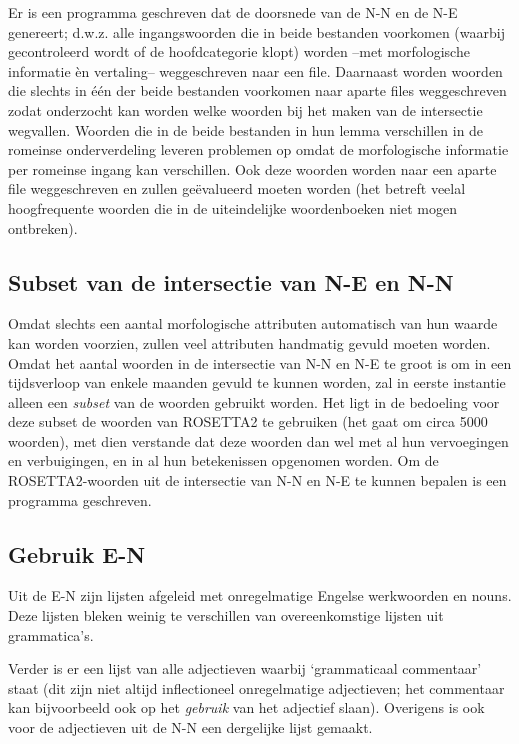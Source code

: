 Er is een programma geschreven dat de doorsnede van de N-N en de N-E genereert;
d.w.z. alle ingangswoorden die in beide bestanden voorkomen (waarbij 
gecontroleerd wordt of de hoofdcategorie klopt) worden --met morfologische 
informatie \`{e}n vertaling-- weggeschreven naar een
file. Daarnaast worden woorden die slechts in \'{e}\'{e}n der beide bestanden 
voorkomen
naar aparte files weggeschreven zodat onderzocht kan worden welke woorden
bij het maken van de intersectie wegvallen. 
Woorden die in de beide bestanden in hun lemma verschillen in de romeinse 
onderverdeling leveren problemen op omdat de morfologische informatie per
romeinse ingang kan verschillen. Ook deze woorden worden naar een aparte file 
weggeschreven en zullen ge\"{e}valueerd moeten worden (het betreft veelal
hoogfrequente woorden die in de uiteindelijke woordenboeken niet mogen 
ontbreken).

\subsection{Subset van de intersectie van N-E en N-N}

Omdat slechts een aantal morfologische attributen automatisch van hun waarde
kan worden voorzien, zullen veel attributen handmatig gevuld moeten worden.
Omdat het aantal woorden in de intersectie van N-N en N-E te groot is om in 
een tijdsverloop van enkele maanden gevuld te kunnen worden, zal in eerste
instantie alleen een {\em subset} van de woorden gebruikt worden. Het ligt in 
de bedoeling voor deze subset de woorden van ROSETTA2 te gebruiken
(het gaat om circa 5000 woorden), met dien 
verstande dat deze woorden dan wel met al hun vervoegingen en verbuigingen, en
in al hun betekenissen opgenomen worden. Om de ROSETTA2-woorden uit de 
intersectie van N-N en N-E te kunnen bepalen is een programma geschreven.

\subsection{Gebruik E-N}

Uit de E-N zijn lijsten afgeleid met onregelmatige Engelse werkwoorden
en nouns. Deze lijsten bleken weinig te verschillen van overeenkomstige lijsten
uit grammatica's. 

Verder is er een lijst van alle adjectieven waarbij `grammaticaal
commentaar' staat (dit zijn niet altijd inflectioneel onregelmatige 
adjectieven; het 
commentaar kan bijvoorbeeld ook op het {\em gebruik} van het adjectief slaan).
Overigens is ook voor de adjectieven uit de N-N een dergelijke lijst gemaakt.

